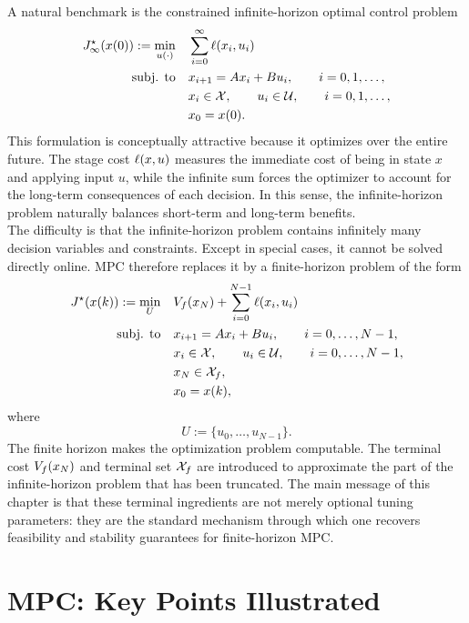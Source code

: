 A natural benchmark is the constrained infinite-horizon optimal control problem
\[
\begin{aligned}
    J_\infty^\star(x(0))
    :=
    \min_{u(\cdot)} \quad
    & \sum_{i=0}^{\infty} \ell(x_i,u_i) \\
    \text{subj. to} \quad
    & x_{i+1} = A x_i + B u_i, \qquad i = 0,1,\ldots,\\
    & x_i \in \mathcal{X}, \qquad u_i \in \mathcal{U}, \qquad i = 0,1,\ldots,\\
    & x_0 = x(0).
\end{aligned}
\]
This formulation is conceptually attractive because it optimizes over the entire future. The
stage cost \(\ell(x,u)\) measures the immediate cost of being in state \(x\) and applying
input \(u\), while the infinite sum forces the optimizer to account for the long-term consequences
of each decision. In this sense, the infinite-horizon problem naturally balances short-term and
long-term benefits.\\
The difficulty is that the infinite-horizon problem contains infinitely many decision variables
and constraints. Except in special cases, it cannot be solved directly online. MPC therefore
replaces it by a finite-horizon problem of the form
\[
\begin{aligned}
    J^\star(x(k))
    :=
    \min_{U} \quad
    & V_f(x_N) + \sum_{i=0}^{N-1} \ell(x_i,u_i) \\
    \text{subj. to} \quad
    & x_{i+1} = A x_i + B u_i, \qquad i = 0,\ldots,N-1,\\
    & x_i \in \mathcal{X}, \qquad u_i \in \mathcal{U}, \qquad i = 0,\ldots,N-1,\\
    & x_N \in \mathcal{X}_f,\\
    & x_0 = x(k),
\end{aligned}
\]
where
\[
    U := \{u_0,\ldots,u_{N-1}\}.
\]
The finite horizon makes the optimization problem computable. The terminal cost
\(V_f(x_N)\) and terminal set \(\mathcal{X}_f\) are introduced to approximate the part of the
infinite-horizon problem that has been truncated. The main message of this chapter is that
these terminal ingredients are not merely optional tuning parameters: they are the standard
mechanism through which one recovers feasibility and stability guarantees for finite-horizon MPC.

\section{MPC: Key Points Illustrated}

